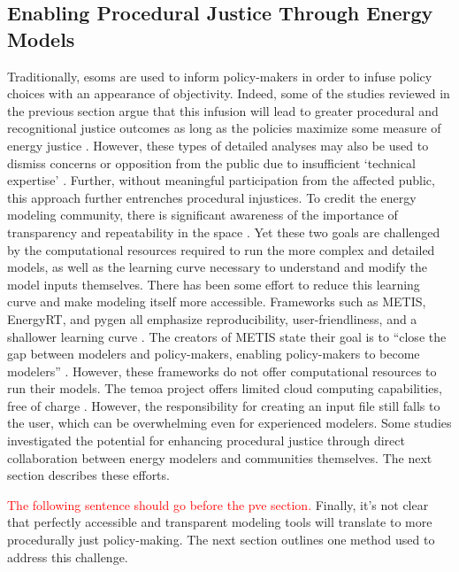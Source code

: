 \subsection{Enabling Procedural Justice Through Energy Models}

Traditionally, \acp{esom} are used to inform policy-makers \cite{li_open_2020}
in order to infuse policy choices with an appearance of objectivity. Indeed,
some of the studies reviewed in the previous section argue that this infusion
will lead to greater procedural and recognitional justice outcomes as long as
the policies maximize some measure of energy justice
\cite{chapman_prioritizing_2018, heffron_resolving_2015}. However, these types
of detailed analyses may also be used to dismiss concerns or opposition from the
public due to insufficient `technical expertise' \cite{johnson_dakota_2021}.
Further, without meaningful participation from the affected public, this
approach further entrenches procedural injustices. To credit the energy modeling
community, there is significant awareness of the importance of transparency and
repeatability in the space \cite{decarolis_case_2012, pfenninger_energy_2014,
pfenninger_openmod_2022, forster_open_2022, hilpert_open_2018}. Yet these two
goals are challenged by the computational resources required to run the more
complex and detailed models, as well as the learning curve necessary to
understand and modify the model inputs themselves. There has been some effort to
reduce this learning curve and make modeling itself more accessible. Frameworks
such as METIS, EnergyRT, and \ac{pygen} all emphasize reproducibility,
user-friendliness, and a shallower learning curve \cite{sakellaris_metis_2018,
lugovoy_energyrt_2022, dotson_python_2021}. The creators of METIS state their
goal is to ``close the gap between modelers and policy-makers, enabling
policy-makers to become modelers'' \cite{sakellaris_metis_2018}. However, these
frameworks do not offer computational resources to run their models. The
\ac{temoa} project offers limited cloud computing capabilities, free of charge
\cite{temoa_project_temoa_2023}. However, the responsibility for creating an
input file still falls to the user, which can be overwhelming even for
experienced modelers. Some studies investigated the potential for enhancing
procedural justice through direct collaboration between energy modelers and
communities themselves. The next section describes these efforts.

\textcolor{red}{The following sentence should go before the \ac{pve} section.}
Finally, it's not clear that perfectly accessible and transparent modeling tools
will translate to more procedurally just policy-making. The next section
outlines one method used to address this challenge.


